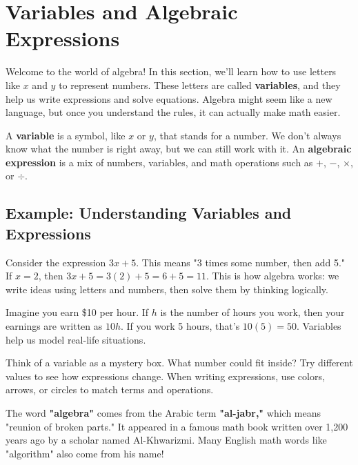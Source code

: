 \cleardoublepage
\section{Variables and Algebraic Expressions}

Welcome to the world of algebra! In this section, we'll learn how to use letters like $x$ and $y$ to represent numbers. These letters are called \textbf{variables}, and they help us write expressions and solve equations. Algebra might seem like a new language, but once you understand the rules, it can actually make math easier.

A \textbf{variable} is a symbol, like $x$ or $y$, that stands for a number. We don't always know what the number is right away, but we can still work with it. An \textbf{algebraic expression} is a mix of numbers, variables, and math operations such as $+$, $-$, $\times$, or $\div$.

\subsection*{Example: Understanding Variables and Expressions}

Consider the expression $3x + 5$. This means "3 times some number, then add 5." If $x = 2$, then $3x + 5 = 3(2) + 5 = 6 + 5 = 11$. This is how algebra works: we write ideas using letters and numbers, then solve them by thinking logically.

Imagine you earn \$10 per hour. If $h$ is the number of hours you work, then your earnings are written as $10h$. If you work 5 hours, that's $10(5) = 50$. Variables help us model real-life situations.

Think of a variable as a mystery box. What number could fit inside? Try different values to see how expressions change. When writing expressions, use colors, arrows, or circles to match terms and operations.

The word \textbf{"algebra"} comes from the Arabic term \textbf{"al-jabr,"} which means "reunion of broken parts." It appeared in a famous math book written over 1,200 years ago by a scholar named Al-Khwarizmi. Many English math words like "algorithm" also come from his name!





